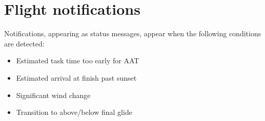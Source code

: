 \section{Flight notifications}

 Notifications, appearing as status messages, appear when the
 following conditions are detected: 
\begin{itemize}
\item Estimated task time too early for
 AAT 
\item Estimated arrival at finish past sunset
\item Significant wind change
\item Transition to above/below final glide
\end{itemize}
